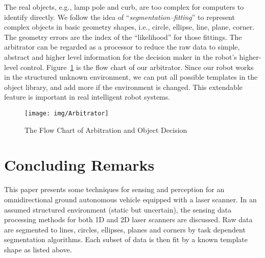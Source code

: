 \documentclass[twocolumn]{IEEEtran}
\begin{document}
%


The real objects, e.g., lamp pole and curb, are too complex for computers to identify directly. We follow the idea of ``{\em segmentation--fitting}'' to represent complex objects in basic geometry shapes, i.e., circle, ellipse, line, plane, corner. The geometry errors are the index of the ``likelihood'' for those fittings. The arbitrator can be regarded as a processor to reduce the raw data to simple, abstract and higher level information for the decision maker in the robot's higher-level control. Figure~\ref{fig:arb} is the flow chart of our arbitrator. Since our robot works in the structured unknown environment, we can put all possible templates in the object library, and add more if the environment is changed. This extendable feature is important in real intelligent robot systems. 




\begin{figure}
  \centering
  \texttt{[image: img/Arbitrator]}\\
  \caption{The Flow Chart of Arbitration and Object Decision}\label{fig:arb}
\end{figure}



\section{Concluding Remarks}  
\label{sec6}
   
This paper presents some techniques for sensing and perception for an
omnidirectional ground autonomous vehicle equipped with a laser scanner. In an
assumed structured environment (static but uncertain), the sensing data processing methods for both 1D and 2D laser scanners are discussed. Raw data are segmented to lines, circles,
ellipses, planes and corners by task dependent segmentation algorithms.  Each
subset of data is then fit by a known template shape as listed above.  
\end{document}
